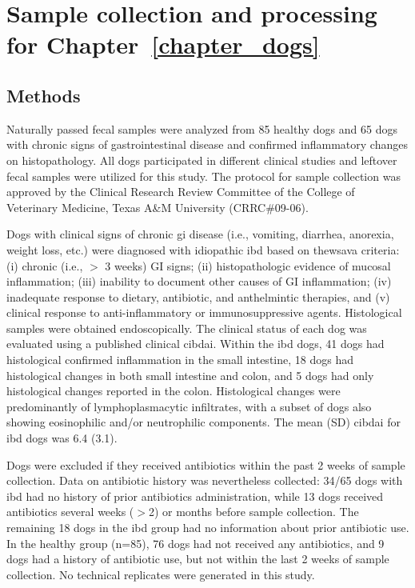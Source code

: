 \chapter{Sample collection and processing for 
Chapter~\ref{chapter_dogs}}\label{appendix_dogs}

\section{Methods}

Naturally passed fecal samples were analyzed from 85 healthy dogs and 65 dogs 
with chronic signs of gastrointestinal disease and confirmed inflammatory 
changes on histopathology. All dogs participated in different clinical studies 
and leftover fecal samples were utilized for this study. The protocol for 
sample collection was approved by the Clinical Research Review Committee of the 
College of Veterinary Medicine, Texas A\&M University (CRRC\#09-06). 

Dogs with clinical signs of chronic \gls{gi} disease (i.e., vomiting, diarrhea, 
anorexia, weight loss, etc.) were diagnosed with idiopathic \gls{ibd} based on 
the\gls{wsava} criteria: (i) chronic (i.e., $>$ 3 weeks) GI signs; (ii) 
histopathologic evidence of mucosal inflammation; (iii) inability to document 
other causes of GI inflammation; (iv) inadequate response to dietary, 
antibiotic, and anthelmintic therapies, and (v) clinical response to 
anti-inflammatory or immunosuppressive agents.  Histological samples were 
obtained endoscopically. The clinical status of each dog was evaluated using a 
published clinical \gls{cibdai}. Within the \gls{ibd} dogs, 41 dogs had 
histological confirmed inflammation in the small intestine, 18 dogs had 
histological changes in both small intestine and colon, and 5 dogs had only 
histological changes reported in the colon. Histological changes were 
predominantly of lymphoplasmacytic infiltrates, with a subset of dogs also 
showing eosinophilic and/or neutrophilic components. The mean (SD) \gls{cibdai} 
for \gls{ibd} dogs was 6.4 (3.1).

Dogs were excluded if they received antibiotics within the past 2 weeks of 
sample collection. Data on antibiotic history was nevertheless collected: 34/65 
dogs with \gls{ibd} had no history of prior antibiotics administration, while 
13 dogs received antibiotics several weeks ($>$2) or months before sample 
collection. The remaining 18 dogs in the \gls{ibd} group had no information 
about prior antibiotic use. In the healthy group (n=85), 76 dogs had not 
received any antibiotics, and 9 dogs had a history of antibiotic use, but not 
within the last 2 weeks of sample collection. No technical replicates were 
generated in this study.

